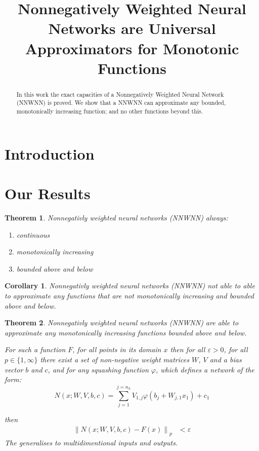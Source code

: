 \documentclass{article} %
\title{Nonnegatively Weighted Neural Networks are Universal Approximators for Monotonic Functions}
\newtheorem{thm}{Theorem}
\newtheorem{cor}{Corollary}[thm]
\begin{document}
\maketitle

\begin{abstract}
In this work the exact capacities of a Nonnegatively Weighted Neural Network (NNWNN) is proved.
We show that a NNWNN can approximate any bounded, monotonically increasing function;
and no other functions beyond this.
\end{abstract}


\section{Introduction}

\section{Our Results}

\begin{thm} \label{thm:upper}
	Nonnegativly weighted neural networks (NNWNN) always:
	
	\begin{enumerate}
		\item continuous 
		\item monotonically increasing
		\item bounded above and below
	\end{enumerate}
\end{thm}
\begin{cor}\label{cor:noapproxapproximate}
	Nonnegativly weighted neural networks (NNWNN) not able to able to approximate any functions that are not monotonically increasing and bounded above and below.
\end{cor}

\begin{thm} \label{thm:nnwnnuat}
	Nonnegativly weighted neural networks (NNWNN) are able to approximate any monotonically increasing functions bounded above and below.
	
	
	For such a function $F$,
	for all points in its domain $x$
	then for all $\varepsilon > 0$, for all $p\in \lbrace 1, \infty \rbrace$
	there exist a set of non-negative weight matrices $W$, $V$ and a bias vector $b$ and $c$,
	and for any squashing function $\varphi$,
	which defines a network of the form:
	\begin{equation}
		N(x;W,V,b,c)=\sum_{j=1}^{j=n_{h}}V_{1,j}\varphi(b_{j}+W_{j,1}x_{1})+c_{1}
	\end{equation}
	
	then 
	\begin{align}
	\left\| N(x;W,V,b, c) - F(x) \right\|_p &< \varepsilon
	\end{align}
	The generalises to multidimentional inputs and outputs.
\end{thm}
\end{document}
